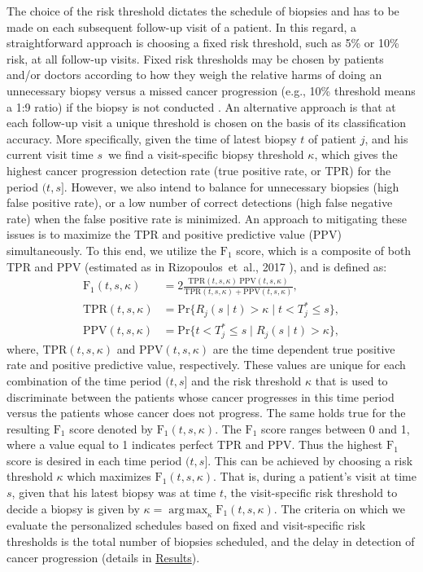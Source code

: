 \documentclass[Afour,sagev,times]{sagej}
\DeclareMathOperator{\argmax}{arg\,max}
\begin{document}
The choice of the risk threshold dictates the schedule of biopsies and has to be made on each subsequent follow-up visit of a patient. In this regard, a straightforward approach is choosing a fixed risk threshold, such as 5\% or 10\% risk, at all follow-up visits. Fixed risk thresholds may be chosen by patients and/or doctors according to how they weigh the relative harms of doing an unnecessary biopsy versus a missed cancer progression (e.g., 10\% threshold means a 1:9 ratio) if the biopsy is not conducted \cite{vickers2006decision}. An alternative approach is that at each follow-up visit a unique threshold is chosen on the basis of its classification accuracy. More specifically, given the time of latest biopsy $t$ of patient $j$, and his current visit time $s$\, we find a visit-specific biopsy threshold $\kappa$, which gives the highest cancer progression detection rate (true positive rate, or TPR) for the period $(t, s]$. However, we also intend to balance for unnecessary biopsies (high false positive rate), or a low number of correct detections (high false negative rate) when the false positive rate is minimized. An approach to mitigating these issues is to maximize the TPR and positive predictive value (PPV) simultaneously. To this end, we utilize the $\mbox{F}_1$ score, which is a composite of both TPR and PPV (estimated as in Rizopoulos~et~al., 2017 \cite{landmarking2017}), and is defined as: 
\begin{equation}
\label{eq:F1_TPR_PPV}
\begin{split}
\mbox{F}_1(t,  s, \kappa) &= 2\frac{\mbox{TPR}(t,  s, \kappa)\ \mbox{PPV}(t,  s, \kappa)}{\mbox{TPR}(t,  s, \kappa) + \mbox{PPV}(t,  s, \kappa)},\\
\mbox{TPR}(t,  s, \kappa) &= \mbox{Pr}\big\{R_j(s \mid t) > \kappa \mid t < T^*_j \leq s\big\},\\
\mbox{PPV}(t,  s, \kappa) &= \mbox{Pr}\big\{t < T^*_j \leq s \mid R_j(s \mid t) > \kappa \big\},
\end{split}
\end{equation}
where, $\mbox{TPR}(t,  s, \kappa)$ and $\mbox{PPV}(t,  s, \kappa)$ are the time dependent true positive rate and positive predictive value, respectively. These values are unique for each combination of the time period $(t, s]$ and the risk threshold $\kappa$ that is used to discriminate between the patients whose cancer progresses in this time period versus the patients whose cancer does not progress. The same holds true for the resulting $\mbox{F}_1$ score denoted by $\mbox{F}_1(t,  s, \kappa)$. The $\mbox{F}_1$ score ranges between 0 and 1, where a value equal to 1 indicates perfect TPR and PPV. Thus the highest $\mbox{F}_1$ score is desired in each time period $(t, s]$. This can be achieved by choosing a risk threshold $\kappa$ which maximizes $\mbox{F}_1(t, s, \kappa)$. That is, during a patient's visit at time $s$, given that his latest biopsy was at time $t$, the visit-specific risk threshold to decide a biopsy is given by ${\kappa=\argmax_{\kappa} \mbox{F}_1(t, s, \kappa)}$. The criteria on which we evaluate the personalized schedules based on fixed and visit-specific risk thresholds is the total number of biopsies scheduled, and the delay in detection of cancer progression (details in \hyperref[sec:results]{Results}). 
\end{document}

